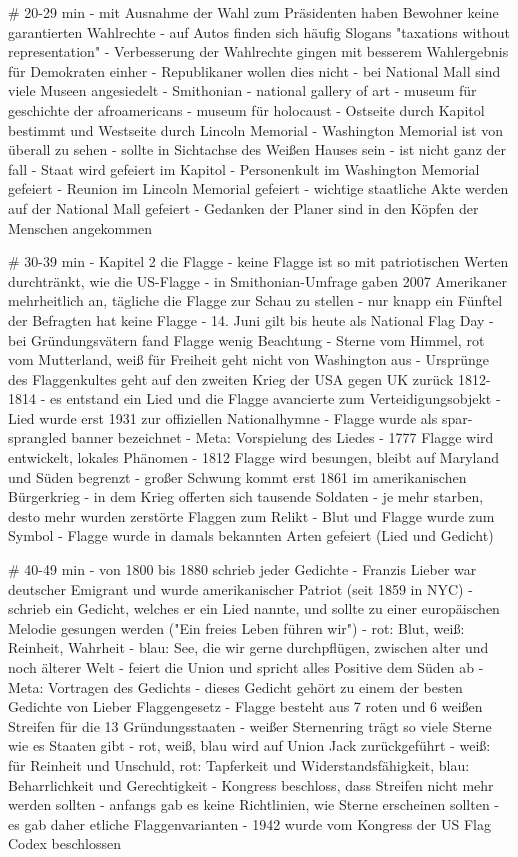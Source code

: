 \documentclass[10pt,a4paper,oneside,ngerman,numbers=noenddot]{scrartcl}
\begin{document}
# 20-29 min
- mit Ausnahme der Wahl zum Präsidenten haben Bewohner keine garantierten
  Wahlrechte
- auf Autos finden sich häufig Slogans "taxations without representation"
- Verbesserung der Wahlrechte gingen mit besserem Wahlergebnis für Demokraten einher
- Republikaner wollen dies nicht
- bei National Mall sind viele Museen angesiedelt
    - Smithonian
    - national gallery of art
    - museum für geschichte der afroamericans
    - museum für holocaust
- Ostseite durch Kapitol bestimmt und Westseite durch Lincoln Memorial
- Washington Memorial ist von überall zu sehen
    - sollte in Sichtachse des Weißen Hauses sein
    - ist nicht ganz der fall
- Staat wird gefeiert im Kapitol
- Personenkult im Washington Memorial gefeiert
- Reunion im Lincoln Memorial gefeiert 
- wichtige staatliche Akte werden auf der National Mall gefeiert
- Gedanken der Planer sind in den Köpfen der Menschen angekommen

# 30-39 min
- Kapitel 2 die Flagge
- keine Flagge ist so mit patriotischen Werten durchtränkt, wie die US-Flagge
- in Smithonian-Umfrage gaben 2007 Amerikaner mehrheitlich an, tägliche die Flagge zur Schau zu stellen
- nur knapp ein Fünftel der Befragten hat keine Flagge
- 14. Juni gilt bis heute als National Flag Day
- bei Gründungsvätern fand Flagge wenig Beachtung
- Sterne vom Himmel, rot vom Mutterland, weiß für Freiheit geht nicht von Washington aus
- Ursprünge des Flaggenkultes geht auf den zweiten Krieg der USA gegen UK zurück 1812-1814
- es entstand ein Lied und die Flagge avancierte zum Verteidigungsobjekt
- Lied wurde erst 1931 zur offiziellen Nationalhymne
- Flagge wurde als spar-sprangled banner bezeichnet
- Meta: Vorspielung des Liedes
- 1777 Flagge wird entwickelt, lokales Phänomen
- 1812 Flagge wird besungen, bleibt auf Maryland und Süden begrenzt
- großer Schwung kommt erst 1861 im amerikanischen Bürgerkrieg
- in dem Krieg offerten sich tausende Soldaten
- je mehr starben, desto mehr wurden zerstörte Flaggen zum Relikt
- Blut und Flagge wurde zum Symbol
- Flagge wurde in damals bekannten Arten gefeiert (Lied und Gedicht)

# 40-49 min
- von 1800 bis 1880 schrieb jeder Gedichte
- Franzis Lieber war deutscher Emigrant und wurde amerikanischer Patriot (seit 1859 in NYC)
- schrieb ein Gedicht, welches er ein Lied nannte, und sollte zu einer europäischen Melodie gesungen werden
  ("Ein freies Leben führen wir")
  - rot: Blut, weiß: Reinheit, Wahrheit
  - blau: See, die wir gerne durchpflügen, zwischen alter und noch älterer Welt
  - feiert die Union und spricht alles Positive dem Süden ab
- Meta: Vortragen des Gedichts
- dieses Gedicht gehört zu einem der besten Gedichte von Lieber
Flaggengesetz
- Flagge besteht aus 7 roten und 6 weißen Streifen für die 13 Gründungsstaaten
- weißer Sternenring trägt so viele Sterne wie es Staaten gibt
- rot, weiß, blau wird auf Union Jack zurückgeführt
- weiß: für Reinheit und Unschuld, rot: Tapferkeit und Widerstandsfähigkeit, blau: Beharrlichkeit und Gerechtigkeit
- Kongress beschloss, dass Streifen nicht mehr werden sollten
- anfangs gab es keine Richtlinien, wie Sterne erscheinen sollten
- es gab daher etliche Flaggenvarianten
- 1942 wurde vom Kongress der US Flag Codex beschlossen
\end{document}
